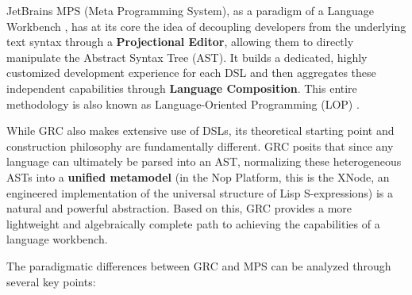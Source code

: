 \documentclass[11pt]{article}
\begin{document}
JetBrains MPS (Meta Programming System), as a paradigm of a Language Workbench \cite{erdweg2013, fowler2005lw}, has at its core the idea of decoupling developers from the underlying text syntax through a \textbf{Projectional Editor}, allowing them to directly manipulate the Abstract Syntax Tree (AST). It builds a dedicated, highly customized development experience for each DSL and then aggregates these independent capabilities through \textbf{Language Composition}. This entire methodology is also known as Language-Oriented Programming (LOP) \cite{dmitriev2004}.

While GRC also makes extensive use of DSLs, its theoretical starting point and construction philosophy are fundamentally different. GRC posits that since any language can ultimately be parsed into an AST, normalizing these heterogeneous ASTs into a \textbf{unified metamodel} (in the Nop Platform, this is the XNode, an engineered implementation of the universal structure of Lisp S-expressions) is a natural and powerful abstraction. Based on this, GRC provides a more lightweight and algebraically complete path to achieving the capabilities of a language workbench.

The paradigmatic differences between GRC and MPS can be analyzed through several key points:
\end{document}
